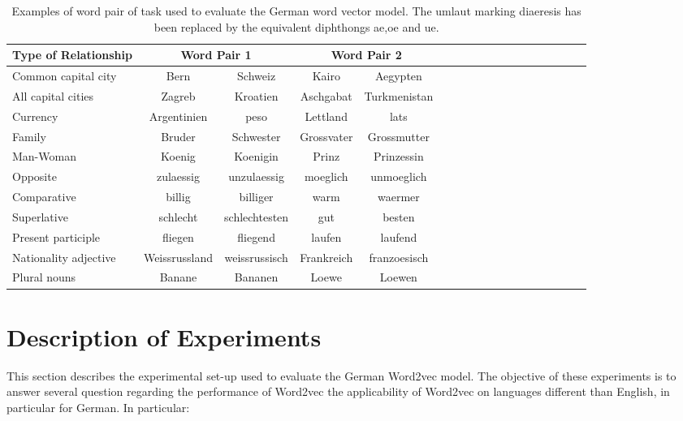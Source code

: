 \begin{table}[h]
  \centering
  \caption{Examples of word pair  of task  used  to evaluate the German word
    vector model. The umlaut marking diaeresis has been replaced by the
    equivalent diphthongs ae,oe and ue.   \textit{} }
  \label{tab:task_deutsch_modified}

  \begin{tabular}{ |l| |c|*{4}{c| |c| c | c }  }

  \hline           
  Type of Relationship &  \multicolumn{2}{c||}{Word Pair 1} &
  \multicolumn{2}{c|}{Word Pair 2} \\  \hline           
  Common capital city & Bern &  Schweiz & Kairo  & Aegypten \\ 
  All capital cities  & Zagreb &  Kroatien & Aschgabat & Turkmenistan  \\
  Currency & Argentinien & peso  & Lettland  & lats \\ 
  Family & Bruder & Schwester  & Grossvater & Grossmutter \\
  Man-Woman & Koenig & Koenigin  &  Prinz & Prinzessin   \\  \hline  
  Opposite & zulaessig & unzulaessig & moeglich & unmoeglich \\  
  Comparative & billig & billiger & warm & waermer \\  
  Superlative & schlecht & schlechtesten & gut & besten \\  
  Present participle & fliegen & fliegend & laufen & laufend \\  
  Nationality adjective & Weissrussland & weissrussisch & Frankreich  & franzoesisch  \\  
  Plural nouns  & Banane & Bananen & Loewe & Loewen \\
  \hline
\end{tabular}
\end{table}



\section{Description of Experiments}
\label{sec:german_eng_experiments}

This section describes the experimental set-up used to evaluate the German
Word2vec model. The objective of these experiments is to answer several
question regarding the performance of Word2vec the applicability of Word2vec
on languages different than  English,  in particular for German.  In
particular:

